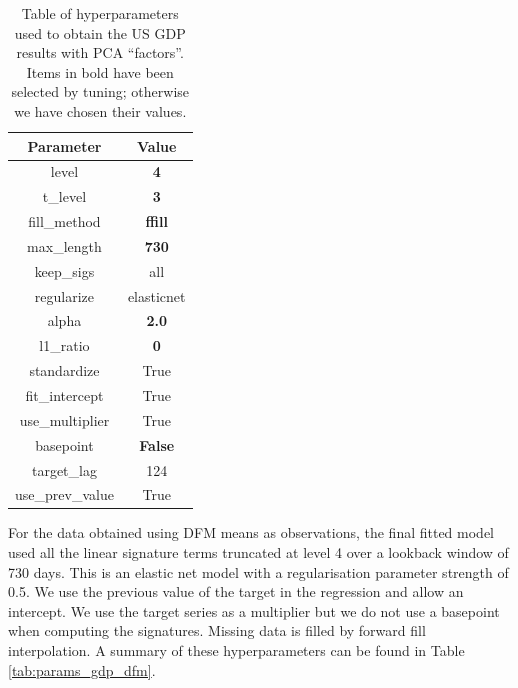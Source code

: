 \documentclass[a4paper, 12pt]{article}
\theoremstyle{remark}
\begin{document}
\begin{table}[hp]
    \centering
    \caption{Table of hyperparameters used to obtain the US GDP results with PCA ``factors''. Items in bold have been selected by tuning; otherwise we have chosen their values.}
    \begin{tabular}{c c}
         Parameter & Value \\
         \hline
         \hline
        level & \textbf{4} \\
        t\_level & \textbf{3} \\
        fill\_method & \textbf{ffill} \\
        max\_length & \textbf{730} \\
        keep\_sigs & all \\
        regularize & elasticnet \\
        alpha & \textbf{2.0} \\
        l1\_ratio & \textbf{0} \\
        standardize & True \\
        fit\_intercept & True \\
        use\_multiplier &  True \\
        basepoint &  \textbf{False} \\
        target\_lag & 124 \\
        use\_prev\_value & True
        
    \end{tabular}
    \label{tab:params_gdp_pca}
\end{table}

For the data obtained using DFM means as observations, the final fitted model used all the linear signature terms truncated at level 4 over a lookback window of 730 days. This is an elastic net model with a regularisation parameter strength of 0.5. We use the previous value of the target in the regression and allow an intercept. We use the target series as a multiplier but we do not use a basepoint when computing the signatures. Missing data is filled by forward fill interpolation. A summary of these hyperparameters can be found in Table \ref{tab:params_gdp_dfm}.
\end{document}
